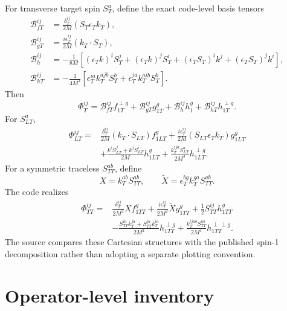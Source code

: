 \documentclass[11pt,oneside]{book}
\begin{document}
For transverse target spin $S_T^a$, define the exact code-level basis tensors
\begin{align}
 \mathcal B_{fT}^{ij}
 &=\frac{\delta_T^{ij}}{2M}(S_T\epsilon_T k_T),\\
 \mathcal B_{gT}^{ij}
 &=\frac{i\epsilon_T^{ij}}{2M}(k_T\cdot S_T),\\
 \mathcal B_{h}^{ij}
 &=-\frac{1}{8M}\left[
 (\epsilon_Tk)^iS_T^j+(\epsilon_Tk)^jS_T^i
 +(\epsilon_TS_T)^ik^j+(\epsilon_TS_T)^jk^i
 \right],\\
 \mathcal B_{hT}^{ij}
 &=-\frac{1}{4M^3}\left[
 \epsilon_T^{ia}k_T^{ajb}S_T^b
 +\epsilon_T^{ja}k_T^{aib}S_T^b
 \right].
\end{align}
Then
\begin{equation}
 \Phi_T^{ij}
 =\mathcal B_{fT}^{ij}f_{1T}^{\perp g}
 +\mathcal B_{gT}^{ij}g_{1T}^g
 +\mathcal B_h^{ij}h_1^g
 +\mathcal B_{hT}^{ij}h_{1T}^{\perp g}.
 \label{eq:gluon-T}
\end{equation}
For $S_{LT}^a$,
\begin{align}
 \Phi_{LT}^{ij}={}&
 \frac{\delta_T^{ij}}{2M}(k_T\cdot S_{LT})f_{1LT}^g
 +\frac{i\epsilon_T^{ij}}{2M}(S_{LT}\epsilon_Tk_T)g_{1LT}^g
 \nonumber\\
 &+\frac{k^iS_{LT}^j+k^jS_{LT}^i}{2M}h_{1LT}^g
 +\frac{k_T^{ija}S_{LT}^a}{2M^3}h_{1LT}^{\perp g}.
 \label{eq:gluon-LT}
\end{align}
For a symmetric traceless $S_{TT}^{ab}$, define
\begin{equation}
 X=k_T^{ab}S_{TT}^{ab},
 \qquad
 \widetilde X=\epsilon_T^{bg}k_T^{ga}S_{TT}^{ab}.
\end{equation}
The code realizes
\begin{align}
 \Phi_{TT}^{ij}={}&
 \frac{\delta_T^{ij}}{2M^2}X f_{1TT}^g
 +\frac{i\epsilon_T^{ij}}{2M^2}\widetilde X g_{1TT}^g
 +\frac12S_{TT}^{ij}h_{1TT}^g
 \nonumber\\
 &-\frac{S_{TT}^{ia}k_T^{ja}+S_{TT}^{ja}k_T^{ia}}{2M^2}h_{1TT}^{\perp g}
 +\frac{k_T^{ijab}S_{TT}^{ab}}{2M^4}h_{1TT}^{\perp\perp g}.
 \label{eq:gluon-TT}
\end{align}
The source compares these Cartesian structures with the published spin-1 decomposition rather than adopting a separate plotting convention.

\section{Operator-level inventory}
\end{document}
